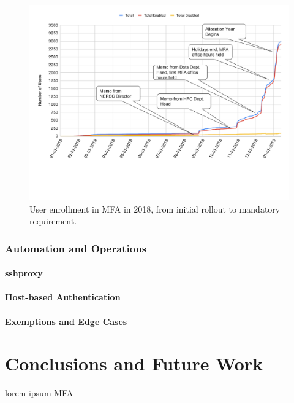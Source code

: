\documentclass[sigconf,review]{acmart}
\begin{document}
\begin{figure}[h]
  \centering
  \includegraphics[width=\textwidth]{uptake.png}
  \caption{User enrollment in MFA in 2018, from initial rollout to mandatory requirement.}
\end{figure}

\subsubsection{Automation and Operations}
\label{auto}

\paragraph{sshproxy}
\label{proxy}

\paragraph{Host-based Authentication}
\label{host}

\paragraph{Exemptions and Edge Cases}
\label{edge}

\section{Conclusions and Future Work}
\label{conc}

lorem ipsum MFA



\end{document}
